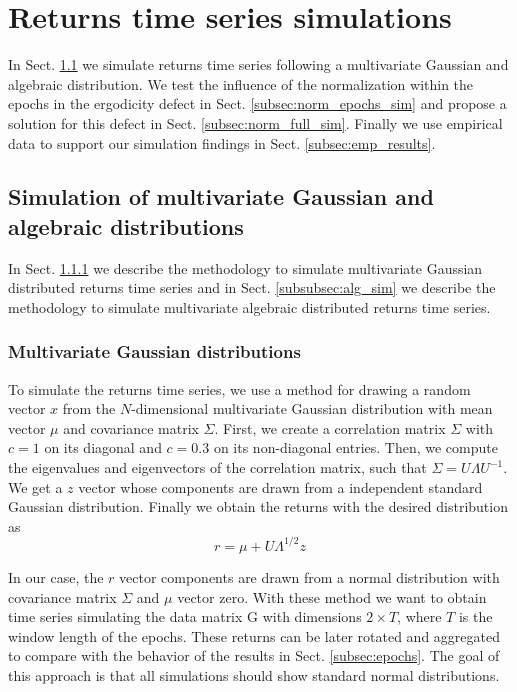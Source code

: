 \section{Returns time series simulations}
\label{sec:simulations}

In Sect. \ref{subsec:gauss_alg_sim} we simulate returns time series following
a multivariate Gaussian and algebraic distribution. We test the influence of
the normalization within the epochs in the ergodicity defect in Sect.
\ref{subsec:norm_epochs_sim} and propose a solution for this defect in Sect.
\ref{subsec:norm_full_sim}. Finally we use empirical data to support our
simulation findings in Sect. \ref{subsec:emp_results}.

\subsection{Simulation of multivariate Gaussian and algebraic distributions}
\label{subsec:gauss_alg_sim}

In Sect. \ref{subsubsec:gauss_sim} we describe the methodology to simulate
multivariate Gaussian distributed returns time series and in Sect.
\ref{subsubsec:alg_sim} we describe the methodology to simulate multivariate
algebraic distributed returns time series.

\subsubsection{Multivariate Gaussian distributions}\label{subsubsec:gauss_sim}

To simulate the returns time series, we use a method \cite{drawing_dist} for
drawing a random vector $x$ from the $N$-dimensional multivariate Gaussian
distribution with mean vector $\mu$ and covariance matrix $\Sigma$. First, we
create a correlation matrix $\Sigma$ with $c = 1$ on its diagonal and $c = 0.3$
on its non-diagonal entries. Then, we compute the eigenvalues and eigenvectors
of the correlation matrix, such that $\Sigma = U \Lambda U^{-1}$. We get a $z$
vector whose components are drawn from a independent standard Gaussian
distribution. Finally we obtain the returns with the desired distribution as
\begin{equation}
    r = \mu + U \Lambda^{1/2} z
\end{equation}

In our case, the $r$ vector components are drawn from a normal distribution
with covariance matrix $\Sigma$ and $\mu$ vector zero.
With these method we want to obtain time series simulating the data matrix G
with dimensions $2 \times T$, where $T$ is the window length of the epochs.
These returns can be later rotated and aggregated to compare with the behavior
of the results in Sect. \ref{subsec:epochs}.
The goal of this approach is that all simulations should show standard normal
distributions.

